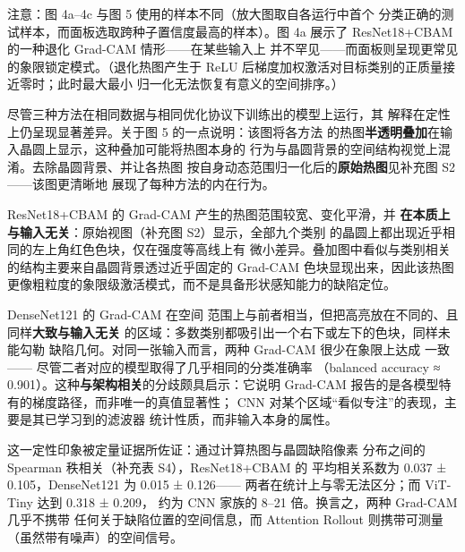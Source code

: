 \documentclass[11pt,a4paper]{article}
\begin{document}
注意：图 4a–4c 与图 5 使用的样本不同（放大图取自各运行中首个 分类正确的测试样本，而面板选取跨种子置信度最高的样本）。图 4a 展示了 ResNet18+CBAM 的一种退化 Grad-CAM 情形——在某些输入上 并不罕见——而面板则呈现更常见的象限锁定模式。（退化热图产生于 ReLU 后梯度加权激活对目标类别的正质量接近零时；此时最大最小 归一化无法恢复有意义的空间排序。）

尽管三种方法在相同数据与相同优化协议下训练出的模型上运行，其 解释在定性上仍呈现显著差异。关于图 5 的一点说明：该图将各方法 的热图\textbf{半透明叠加}在输入晶圆上显示，这种叠加可能将热图本身的 行为与晶圆背景的空间结构视觉上混淆。去除晶圆背景、并让各热图 按自身动态范围归一化后的\textbf{原始热图}见补充图 S2——该图更清晰地 展现了每种方法的内在行为。

ResNet18+CBAM 的 Grad-CAM 产生的热图范围较宽、变化平滑，并 \textbf{在本质上与输入无关}：原始视图（补充图 S2）显示，全部九个类别 的晶圆上都出现近乎相同的左上角红色色块，仅在强度等高线上有 微小差异。叠加图中看似与类别相关的结构主要来自晶圆背景透过近乎固定的 Grad-CAM 色块显现出来，因此该热图更像粗粒度的象限级激活模式，而不是具备形状感知能力的缺陷定位。

DenseNet121 的 Grad-CAM 在空间 范围上与前者相当，但把高亮放在不同的、且同样\textbf{大致与输入无关} 的区域：多数类别都吸引出一个右下或左下的色块，同样未能勾勒 缺陷几何。对同一张输入而言，两种 Grad-CAM 很少在象限上达成 一致 —— 尽管二者对应的模型取得了几乎相同的分类准确率 （balanced accuracy ≈ 0.901）。这种\textbf{与架构相关}的分歧颇具启示：它说明 Grad-CAM 报告的是各模型特有的梯度路径，而非唯一的真值显著性； CNN 对某个区域“看似专注”的表现，主要是其已学习到的滤波器 统计性质，而非输入本身的属性。

这一定性印象被定量证据所佐证：通过计算热图与晶圆缺陷像素 分布之间的 Spearman 秩相关（补充表 S4），ResNet18+CBAM 的 平均相关系数为 0.037 ± 0.105，DenseNet121 为 0.015 ± 0.126—— 两者在统计上与零无法区分；而 ViT-Tiny 达到 0.318 ± 0.209， 约为 CNN 家族的 8–21 倍。换言之，两种 Grad-CAM 几乎不携带 任何关于缺陷位置的空间信息，而 Attention Rollout 则携带可测量 （虽然带有噪声）的空间信号。
\end{document}
